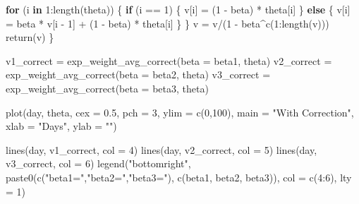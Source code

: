 \documentclass[
  12pt,
]{krantz}
\makeatletter
\newenvironment{Shaded}{\begin{snugshade}}{\end{snugshade}}
\newcommand{\AttributeTok}[1]{\textcolor[rgb]{0.61,0.61,0.61}{#1}}
\newcommand{\ControlFlowTok}[1]{\textcolor[rgb]{0.27,0.27,0.27}{\textbf{#1}}}
\newcommand{\DecValTok}[1]{\textcolor[rgb]{0.06,0.06,0.06}{#1}}
\newcommand{\FloatTok}[1]{\textcolor[rgb]{0.06,0.06,0.06}{#1}}
\newcommand{\FunctionTok}[1]{\textcolor[rgb]{0,0,0}{#1}}
\newcommand{\NormalTok}[1]{#1}
\newcommand{\OtherTok}[1]{\textcolor[rgb]{0.37,0.37,0.37}{#1}}
\newcommand{\SpecialCharTok}[1]{\textcolor[rgb]{0,0,0}{#1}}
\newcommand{\StringTok}[1]{\textcolor[rgb]{0.5,0.5,0.5}{#1}}
\newenvironment{kframe}{%
\medskip{}
\setlength{\fboxsep}{.8em}
 \def\at@end@of@kframe{}%
 \ifinner\ifhmode%
  \def\at@end@of@kframe{\end{minipage}}%
  \begin{minipage}{\columnwidth}%
 \fi\fi%
 \def\FrameCommand##1{\hskip\@totalleftmargin \hskip-\fboxsep
 \colorbox{shadecolor}{##1}\hskip-\fboxsep
     \hskip-\linewidth \hskip-\@totalleftmargin \hskip\columnwidth}%
 \MakeFramed {\advance\hsize-\width
   \@totalleftmargin\z@ \linewidth\hsize
   \@setminipage}}%
 {\par\unskip\endMakeFramed%
 \at@end@of@kframe}
\renewenvironment{Shaded}{\begin{kframe}}{\end{kframe}}
\makeatother
\begin{document}
\begin{Shaded}
\begin{Highlighting}[]
  \ControlFlowTok{for}\NormalTok{ (i }\ControlFlowTok{in} \DecValTok{1}\SpecialCharTok{:}\FunctionTok{length}\NormalTok{(theta)) \{}
    \ControlFlowTok{if}\NormalTok{ (i }\SpecialCharTok{==} \DecValTok{1}\NormalTok{) \{}
\NormalTok{      v[i] }\OtherTok{=}\NormalTok{ (}\DecValTok{1} \SpecialCharTok{{-}}\NormalTok{ beta) }\SpecialCharTok{*}\NormalTok{ theta[i]}
\NormalTok{    \} }\ControlFlowTok{else}\NormalTok{ \{}
\NormalTok{      v[i] }\OtherTok{=}\NormalTok{ beta }\SpecialCharTok{*}\NormalTok{ v[i }\SpecialCharTok{{-}} \DecValTok{1}\NormalTok{] }\SpecialCharTok{+}\NormalTok{ (}\DecValTok{1} \SpecialCharTok{{-}}\NormalTok{ beta) }\SpecialCharTok{*}\NormalTok{ theta[i]}
\NormalTok{    \}}
\NormalTok{  \}}
\NormalTok{  v }\OtherTok{=}\NormalTok{ v}\SpecialCharTok{/}\NormalTok{(}\DecValTok{1} \SpecialCharTok{{-}}\NormalTok{ beta}\SpecialCharTok{\^{}}\FunctionTok{c}\NormalTok{(}\DecValTok{1}\SpecialCharTok{:}\FunctionTok{length}\NormalTok{(v)))}
  \FunctionTok{return}\NormalTok{(v)}
\NormalTok{\}}

\NormalTok{v1\_correct }\OtherTok{=} \FunctionTok{exp\_weight\_avg\_correct}\NormalTok{(}\AttributeTok{beta =}\NormalTok{ beta1, theta)}
\NormalTok{v2\_correct }\OtherTok{=} \FunctionTok{exp\_weight\_avg\_correct}\NormalTok{(}\AttributeTok{beta =}\NormalTok{ beta2, theta)}
\NormalTok{v3\_correct }\OtherTok{=} \FunctionTok{exp\_weight\_avg\_correct}\NormalTok{(}\AttributeTok{beta =}\NormalTok{ beta3, theta)}

\FunctionTok{plot}\NormalTok{(day, theta, }\AttributeTok{cex =} \FloatTok{0.5}\NormalTok{, }\AttributeTok{pch =} \DecValTok{3}\NormalTok{, }\AttributeTok{ylim =} \FunctionTok{c}\NormalTok{(}\DecValTok{0}\NormalTok{,}\DecValTok{100}\NormalTok{),}
     \AttributeTok{main =} \StringTok{"With Correction"}\NormalTok{,}
     \AttributeTok{xlab =} \StringTok{"Days"}\NormalTok{, }\AttributeTok{ylab =} \StringTok{""}\NormalTok{)}

\FunctionTok{lines}\NormalTok{(day, v1\_correct, }\AttributeTok{col =} \DecValTok{4}\NormalTok{)}
\FunctionTok{lines}\NormalTok{(day, v2\_correct, }\AttributeTok{col =} \DecValTok{5}\NormalTok{)}
\FunctionTok{lines}\NormalTok{(day, v3\_correct, }\AttributeTok{col =} \DecValTok{6}\NormalTok{)}
\FunctionTok{legend}\NormalTok{(}\StringTok{"bottomright"}\NormalTok{,}
       \FunctionTok{paste0}\NormalTok{(}\FunctionTok{c}\NormalTok{(}\StringTok{"beta1="}\NormalTok{,}\StringTok{"beta2="}\NormalTok{,}\StringTok{"beta3="}\NormalTok{),}
              \FunctionTok{c}\NormalTok{(beta1, beta2, beta3)),}
       \AttributeTok{col =} \FunctionTok{c}\NormalTok{(}\DecValTok{4}\SpecialCharTok{:}\DecValTok{6}\NormalTok{), }\AttributeTok{lty =} \DecValTok{1}\NormalTok{)}
\end{Highlighting}
\end{Shaded}
\end{document}
